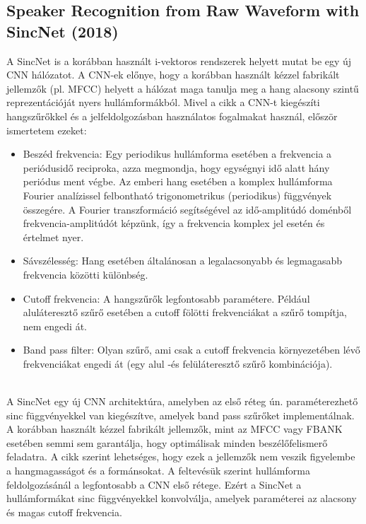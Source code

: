 \subsection{Speaker Recognition from Raw Waveform with SincNet (2018)}

A SincNet is a korábban használt i-vektoros rendszerek helyett mutat be egy új CNN hálózatot. A CNN-ek előnye, hogy a korábban használt kézzel fabrikált jellemzők (pl. MFCC) helyett a hálózat maga tanulja meg a hang alacsony szintű reprezentációját nyers hullámformákból. Mivel a cikk a CNN-t kiegészíti hangszűrőkkel és a jelfeldolgozásban használatos fogalmakat használ, először ismertetem ezeket:
\begin{itemize}
	\item Beszéd frekvencia: Egy periodikus hullámforma esetében a frekvencia a periódusidő reciproka, azza megmondja, hogy egységnyi idő alatt hány periódus ment végbe. Az emberi hang esetében a komplex hullámforma Fourier analízissel felbontható trigonometrikus (periodikus) függvények összegére. A Fourier transzformáció segítségével az idő-amplitúdó doménből frekvencia-amplitúdót képzünk, így a frekvencia komplex jel esetén és értelmet nyer.
	\item Sávszélesség: Hang esetében általánosan a legalacsonyabb és legmagasabb frekvencia közötti különbség.
	\item Cutoff frekvencia: A hangszűrők legfontosabb paramétere. Például aluláteresztő szűrő esetében a cutoff fölötti frekvenciákat a szűrő tompítja, nem engedi át.
	\item Band pass filter: Olyan szűrő, ami csak a cutoff frekvencia környezetében lévő frekvenciákat engedi át (egy alul -és felüláteresztő szűrő kombinációja).
\end{itemize} 
\ \\
\newline
\newline
A SincNet egy új CNN architektúra, amelyben az első réteg ún. paraméterezhető sinc függvényekkel van kiegészítve, amelyek band pass szűrőket implementálnak.
\newline
\newline
A korábban használt kézzel fabrikált jellemzők, mint az MFCC vagy FBANK esetében semmi sem garantálja, hogy optimálisak minden beszélőfelismerő feladatra. A cikk szerint lehetséges, hogy ezek a jellemzők nem veszik figyelembe a hangmagasságot és a formánsokat. A feltevésük szerint hullámforma feldolgozásánál a legfontosabb a CNN első rétege. Ezért a SincNet a hullámformákat sinc függvényekkel konvolválja, amelyek paraméterei az alacsony és magas cutoff frekvencia.


